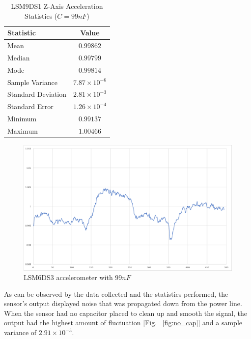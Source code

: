 \begin{table}[H]
\caption{\label{tab:99nF} LSM9DS1 Z-Axis Acceleration Statistics ($C=99nF$)}
\centering
\begin{tabular}{l|c}
\hline\hline
\textbf{Statistic}      & \textbf{Value}            \\\hline
Mean                    & $0.99862$                 \\\hline
Median                  & $0.99799$                 \\\hline
Mode  	                & $0.99814$                 \\\hline
Sample Variance         & $7.87\times10^{\minus6}$  \\\hline
Standard Deviation      & $2.81\times10^{\minus3}$  \\\hline
Standard Error  	    & $1.26\times10^{\minus4}$  \\\hline
Minimum                 & $0.99137$                 \\\hline
Maximum                 & $1.00466$                 \\\hline
\end{tabular}
\end{table}

\begin{figure}[ht]
  \centering
  \includegraphics[width=1.0\textwidth]{Controls/99nF.png}
  \caption{\label{fig:99nF} LSM6DS3 accelerometer with $99nF$}
\end{figure}


As can be observed by the data collected and the statistics performed, the sensor's output displayed noise that was propagated down from the power line. When the sensor had no capacitor placed to clean up and smooth the signal, the output had the highest amount of fluctuation [Fig. ~\ref{fig:no_cap}] and a sample variance of $2.91\times10^{\minus5}$.

